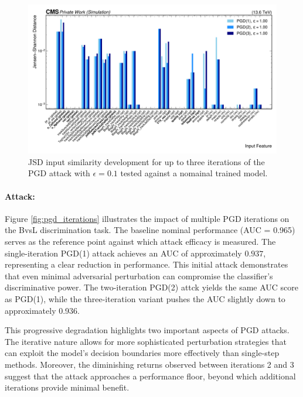 \begin{figure}[H]
\centering
    \includegraphics[width=15cm]{media/output/features/compare/jsd_pgd_iterations_featurewise_hor.pdf}
    \caption{JSD input similarity development for up to three iterations of the PGD attack with $\epsilon=0.1$ tested against a nomainal trained model.}
    \label{fig:pgd_input_overview}
\end{figure}
\FloatBarrier
\newpage
\paragraph{Attack:} Figure \ref{fig:pgd_iterations} illustrates the impact of multiple PGD iterations on the BvsL discrimination task. The baseline nominal performance (AUC = 0.965) serves as the reference point against which attack efficacy is measured. The single-iteration PGD(1) attack achieves an AUC of approximately $0.937$, representing a clear reduction in performance. This initial attack demonstrates that even minimal adversarial perturbation can compromise the classifier's discriminative power. The two-iteration PGD(2) attck yields the same AUC score as PGD(1), while the three-iteration variant  pushes the AUC slightly down to approximately 0.936.

This progressive degradation highlights two important aspects of PGD attacks. The iterative nature allows for more sophisticated perturbation strategies that can exploit the model's decision boundaries more effectively than single-step methods. Moreover, the diminishing returns observed between iterations 2 and 3 suggest that the attack approaches a performance floor, beyond which additional iterations provide minimal benefit.

